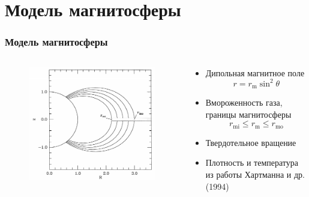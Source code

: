 \documentclass{beamer}
\begin{document}
\section{Модель магнитосферы}

\begin{frame}
\frametitle{Модель магнитосферы}
\begin{columns}[T]
\begin{column}{0.5\textwidth}
\begin{figure}
\includegraphics[width=\textwidth]{hartgrid.png}
\end{figure}
\end{column}
\begin{column}{0.5\textwidth}
\begin{itemize}
\item Дипольная магнитное поле
\begin{equation} \label{eq:dipole}
r = r_\text{m} \sin^2 \theta \nonumber
\end{equation}
\item Вмороженность газа, границы магнитосферы 
\begin{equation}
r_\text{mi} \le r_\text{m} \le r_\text{mo} \nonumber
\end{equation}
\item Твердотельное вращение
\item Плотность и температура из работы Хартманна и др. (1994)
\end{itemize}
\end{column}
\end{columns}
\end{frame}
\end{document}
